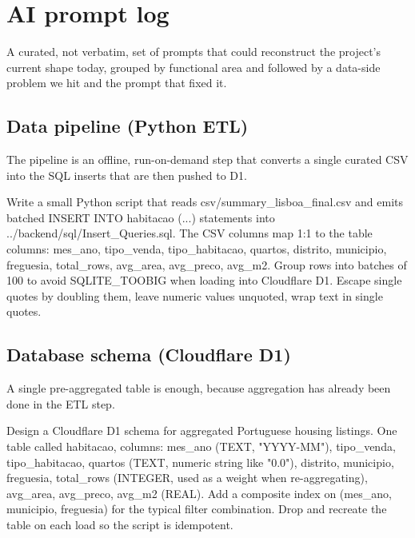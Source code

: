 \documentclass[11pt,a4paper]{article}
\begin{document}
\clearpage
\printbibliography[title={References}]

\clearpage
\appendix
\section{AI prompt log}\label{app:prompts}

A curated, not verbatim, set of prompts that could reconstruct the project's current shape today, grouped by functional area and followed by a data-side problem we hit and the prompt that fixed it.

\newcommand{\prompt}[1]{%
\begin{tcolorbox}[
  colback=black!3,colframe=boxfr,boxrule=0.3pt,arc=1pt,
  boxsep=4pt,left=8pt,right=8pt,top=6pt,bottom=6pt,
  fontupper=\small\ttfamily
]
#1
\end{tcolorbox}}

\subsection{Data pipeline (Python ETL)}

The pipeline is an offline, run-on-demand step that converts a single curated CSV into the SQL inserts that are then pushed to D1.

\prompt{Write a small Python script that reads csv/summary\_lisboa\_final.csv and emits batched INSERT INTO habitacao (...) statements into ../backend/sql/Insert\_Queries.sql. The CSV columns map 1:1 to the table columns: mes\_ano, tipo\_venda, tipo\_habitacao, quartos, distrito, municipio, freguesia, total\_rows, avg\_area, avg\_preco, avg\_m2. Group rows into batches of 100 to avoid SQLITE\_TOOBIG when loading into Cloudflare D1. Escape single quotes by doubling them, leave numeric values unquoted, wrap text in single quotes.}

\subsection{Database schema (Cloudflare D1)}

A single pre-aggregated table is enough, because aggregation has already been done in the ETL step.

\prompt{Design a Cloudflare D1 schema for aggregated Portuguese housing listings. One table called habitacao, columns: mes\_ano (TEXT, "YYYY-MM"), tipo\_venda, tipo\_habitacao, quartos (TEXT, numeric string like "0.0"), distrito, municipio, freguesia, total\_rows (INTEGER, used as a weight when re-aggregating), avg\_area, avg\_preco, avg\_m2 (REAL). Add a composite index on (mes\_ano, municipio, freguesia) for the typical filter combination. Drop and recreate the table on each load so the script is idempotent.}
\end{document}
